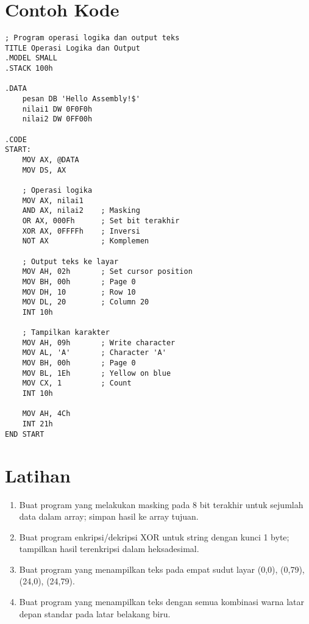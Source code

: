 \documentclass[../main.tex]{subfiles}
\begin{document}
\section{Contoh Kode}
\begin{verbatim}
; Program operasi logika dan output teks
TITLE Operasi Logika dan Output
.MODEL SMALL
.STACK 100h

.DATA
    pesan DB 'Hello Assembly!$'
    nilai1 DW 0F0F0h
    nilai2 DW 0FF00h

.CODE
START:
    MOV AX, @DATA
    MOV DS, AX
    
    ; Operasi logika
    MOV AX, nilai1
    AND AX, nilai2    ; Masking
    OR AX, 000Fh      ; Set bit terakhir
    XOR AX, 0FFFFh    ; Inversi
    NOT AX            ; Komplemen
    
    ; Output teks ke layar
    MOV AH, 02h       ; Set cursor position
    MOV BH, 00h       ; Page 0
    MOV DH, 10        ; Row 10
    MOV DL, 20        ; Column 20
    INT 10h
    
    ; Tampilkan karakter
    MOV AH, 09h       ; Write character
    MOV AL, 'A'       ; Character 'A'
    MOV BH, 00h       ; Page 0
    MOV BL, 1Eh       ; Yellow on blue
    MOV CX, 1         ; Count
    INT 10h
    
    MOV AH, 4Ch
    INT 21h
END START
\end{verbatim}

\section{Latihan}
\begin{enumerate}
  \item Buat program yang melakukan masking pada 8 bit terakhir untuk sejumlah data dalam array; simpan hasil ke array tujuan.
  \item Buat program enkripsi/dekripsi XOR untuk string dengan kunci 1 byte; tampilkan hasil terenkripsi dalam heksadesimal.
  \item Buat program yang menampilkan teks pada empat sudut layar (0,0), (0,79), (24,0), (24,79).
  \item Buat program yang menampilkan teks dengan semua kombinasi warna latar depan standar pada latar belakang biru.
\end{enumerate}
\end{document}
